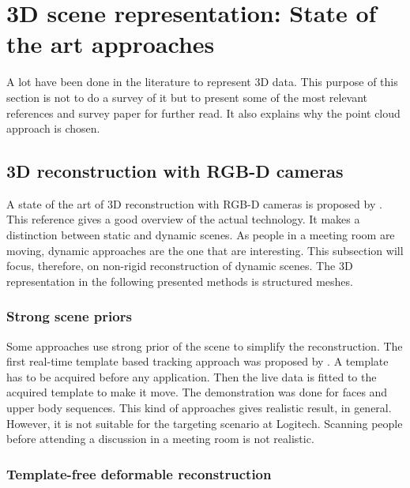 \section{3D scene representation: State of the art approaches}
\label{section:3d scene representation}


A lot have been done in the literature to represent 3D data. This purpose of this section is not to do a survey of it but to present some of the most relevant references and survey paper for further read. It also explains why the point cloud approach is chosen.


\subsection{3D reconstruction with RGB-D cameras}

A state of the art of 3D reconstruction with RGB-D cameras is proposed by \cite{zollhofer_state_2018}. This reference gives a good overview of the actual technology. It makes a distinction between static and dynamic scenes. As people in a meeting room are moving, dynamic approaches are the one that are interesting. This subsection will focus, therefore, on non-rigid reconstruction of dynamic scenes. The 3D representation in the following presented methods is structured meshes.

\subsubsection{Strong scene priors}

Some approaches use strong prior of the scene to simplify the reconstruction. The first real-time template based tracking approach was proposed by \cite{zollhofer_real-time_2014}. A template has to be acquired before any application. Then the live data is fitted to the acquired template to make it move. The demonstration was done for faces and upper body sequences. This kind of approaches gives realistic result, in general. However, it is not suitable for the targeting scenario at Logitech. Scanning people before attending a discussion in a meeting room is not realistic.

\subsubsection{Template-free deformable reconstruction}

